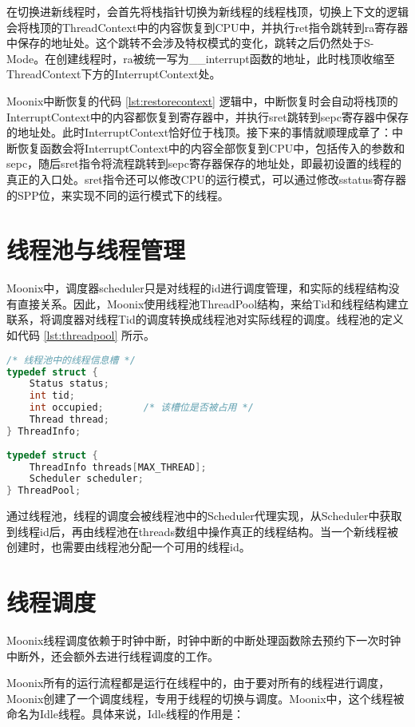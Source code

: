 在切换进新线程时，会首先将栈指针切换为新线程的线程栈顶，切换上下文的逻辑会将栈顶的ThreadContext中的内容恢复到CPU中，并执行ret指令跳转到ra寄存器中保存的地址处。这个跳转不会涉及特权模式的变化，跳转之后仍然处于S-Mode。在创建线程时，ra被统一写为\_\_interrupt函数的地址，此时栈顶收缩至ThreadContext下方的InterruptContext处。

Moonix中断恢复的代码 \ref{lst:restorecontext} 逻辑中，中断恢复时会自动将栈顶的InterruptContext中的内容都恢复到寄存器中，并执行sret跳转到sepc寄存器中保存的地址处。此时InterruptContext恰好位于栈顶。接下来的事情就顺理成章了：中断恢复函数会将InterruptContext中的内容全部恢复到CPU中，包括传入的参数和sepc，随后sret指令将流程跳转到sepc寄存器保存的地址处，即最初设置的线程的真正的入口处。sret指令还可以修改CPU的运行模式，可以通过修改sstatus寄存器的SPP位，来实现不同的运行模式下的线程。

\section{线程池与线程管理}

Moonix中，调度器scheduler只是对线程的id进行调度管理，和实际的线程结构没有直接关系。因此，Moonix使用线程池ThreadPool结构，来给Tid和线程结构建立联系，将调度器对线程Tid的调度转换成线程池对实际线程的调度。线程池的定义如代码 \ref{lst:threadpool} 所示。

\begin{lstlisting}[language={C}, caption={线程池定义}, label={lst:threadpool}]
/* 线程池中的线程信息槽 */
typedef struct {
	Status status;
	int tid;
	int occupied;       /* 该槽位是否被占用 */
	Thread thread;
} ThreadInfo;
	
typedef struct {
	ThreadInfo threads[MAX_THREAD];
	Scheduler scheduler;
} ThreadPool;
\end{lstlisting}

通过线程池，线程的调度会被线程池中的Scheduler代理实现，从Scheduler中获取到线程id后，再由线程池在threads数组中操作真正的线程结构。当一个新线程被创建时，也需要由线程池分配一个可用的线程id。

\section{线程调度}

Moonix线程调度依赖于时钟中断，时钟中断的中断处理函数除去预约下一次时钟中断外，还会额外去进行线程调度的工作。

Moonix所有的运行流程都是运行在线程中的，由于要对所有的线程进行调度，Moonix创建了一个调度线程，专用于线程的切换与调度。Moonix中，这个线程被命名为Idle线程。具体来说，Idle线程的作用是：

